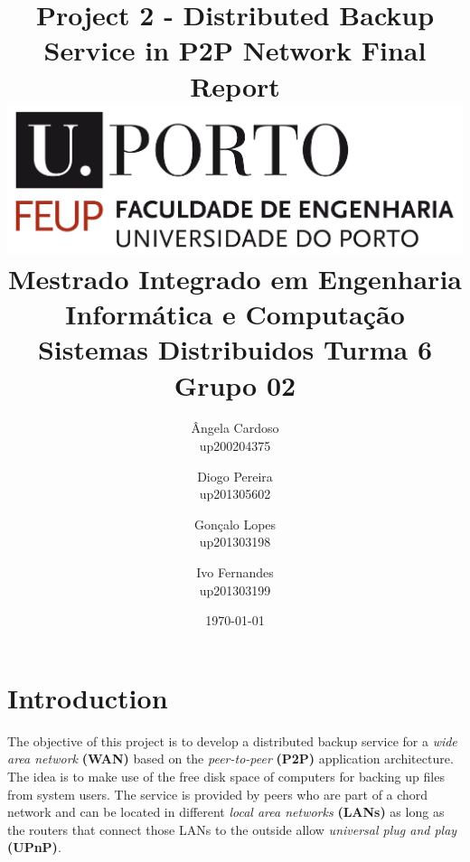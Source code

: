 \documentclass[11pt]{article}
\begin{document}
\title{\Huge\textbf{Project 2 - Distributed Backup Service in P2P Network}\linebreak\linebreak\linebreak\linebreak
\Large\textbf{Final Report}\linebreak\linebreak\linebreak\linebreak\linebreak
\includegraphics[scale=0.1]{feup-logo.png}\linebreak\linebreak
\linebreak\linebreak
\Large{Mestrado Integrado em \linebreak Engenharia Informática e Computação} \linebreak\linebreak
\Large{Sistemas Distribuidos}\linebreak\linebreak
\large{Turma 6 Grupo 02}\linebreak
}

\author{
Ângela Cardoso\\ up200204375\\
\and
Diogo Pereira\\ up201305602\\
\and
Gonçalo Lopes\\ up201303198\\
\and
Ivo Fernandes\\ up201303199\\
}
\date{\today}
\maketitle
\thispagestyle{empty}
\newpage
\tableofcontents
\newpage

\section{Introduction}
The objective of this project is to develop a distributed backup service for a \textit{wide area network} \textbf{(WAN)} based on the \textit{peer-to-peer} \textbf{(P2P)} application architecture. The idea is to make use of the free disk space of computers for backing up files from system users. The service is provided by peers who are part of a chord network and can be located in different \textit{local area networks} \textbf{(LANs)} as long as the routers that connect those LANs to the outside allow \textit{universal plug and play} \textbf{(UPnP)}.
\end{document}
